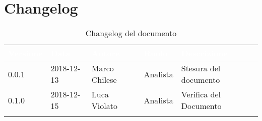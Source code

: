 \newpage

\section{Changelog}

\begin{center}
\begin{longtable}[c]{|m{}|m{}|m{}|m{}|p{}|}
\hline
\rowcolor{bluelogo}\textbf{\textcolor{white}{Versione}} & \textbf{\textcolor{white}{Data}} & \textbf{\textcolor{white}{Autore}} & \textbf{\textcolor{white}{Ruolo}} & \textbf{\textcolor{white}{Descrizione}}\\
\hline \hline
\endfirsthead
0.0.1 & 2018-12-13 & Marco Chilese & Analista & Stesura del documento \\
\hline
\rowcolor{grigio} 0.1.0 & 2018-12-15 & Luca Violato & Analista & Verifica del Documento \\
\hline
\caption{Changelog del documento}
\end{longtable}
\end{center}
